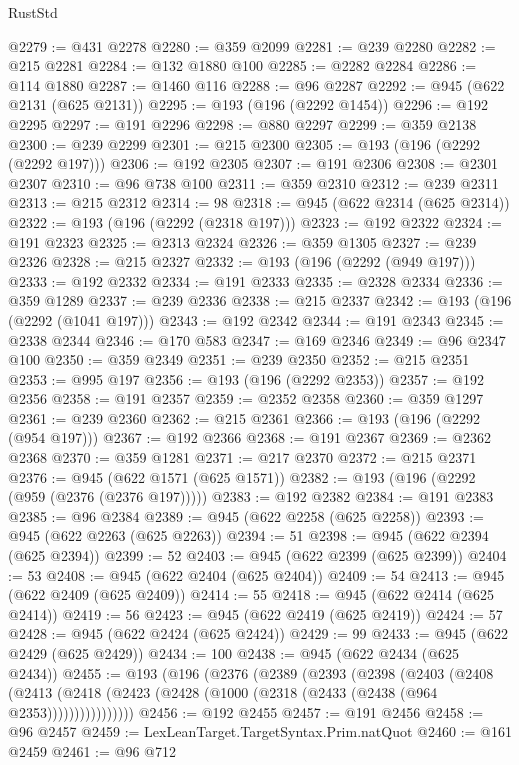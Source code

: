 \begin{lexlean}{RustStd}
\begin{coremodule}
@2279 := @431 @2278
@2280 := @359 @2099
@2281 := @239 @2280
@2282 := @215 @2281
@2284 := @132 @1880 @100
@2285 := @2282 @2284
@2286 := @114 @1880
@2287 := @1460 @116
@2288 := @96 @2287
@2292 := @945 (@622 @2131 (@625 @2131))
@2295 := @193 (@196 (@2292 @1454))
@2296 := @192 @2295
@2297 := @191 @2296
@2298 := @880 @2297
@2299 := @359 @2138
@2300 := @239 @2299
@2301 := @215 @2300
@2305 := @193 (@196 (@2292 (@2292 @197)))
@2306 := @192 @2305
@2307 := @191 @2306
@2308 := @2301 @2307
@2310 := @96 @738 @100
@2311 := @359 @2310
@2312 := @239 @2311
@2313 := @215 @2312
@2314 := 98
@2318 := @945 (@622 @2314 (@625 @2314))
@2322 := @193 (@196 (@2292 (@2318 @197)))
@2323 := @192 @2322
@2324 := @191 @2323
@2325 := @2313 @2324
@2326 := @359 @1305
@2327 := @239 @2326
@2328 := @215 @2327
@2332 := @193 (@196 (@2292 (@949 @197)))
@2333 := @192 @2332
@2334 := @191 @2333
@2335 := @2328 @2334
@2336 := @359 @1289
@2337 := @239 @2336
@2338 := @215 @2337
@2342 := @193 (@196 (@2292 (@1041 @197)))
@2343 := @192 @2342
@2344 := @191 @2343
@2345 := @2338 @2344
@2346 := @170 @583
@2347 := @169 @2346
@2349 := @96 @2347 @100
@2350 := @359 @2349
@2351 := @239 @2350
@2352 := @215 @2351
@2353 := @995 @197
@2356 := @193 (@196 (@2292 @2353))
@2357 := @192 @2356
@2358 := @191 @2357
@2359 := @2352 @2358
@2360 := @359 @1297
@2361 := @239 @2360
@2362 := @215 @2361
@2366 := @193 (@196 (@2292 (@954 @197)))
@2367 := @192 @2366
@2368 := @191 @2367
@2369 := @2362 @2368
@2370 := @359 @1281
@2371 := @217 @2370
@2372 := @215 @2371
@2376 := @945 (@622 @1571 (@625 @1571))
@2382 := @193 (@196 (@2292 (@959 (@2376 (@2376 @197)))))
@2383 := @192 @2382
@2384 := @191 @2383
@2385 := @96 @2384
@2389 := @945 (@622 @2258 (@625 @2258))
@2393 := @945 (@622 @2263 (@625 @2263))
@2394 := 51
@2398 := @945 (@622 @2394 (@625 @2394))
@2399 := 52
@2403 := @945 (@622 @2399 (@625 @2399))
@2404 := 53
@2408 := @945 (@622 @2404 (@625 @2404))
@2409 := 54
@2413 := @945 (@622 @2409 (@625 @2409))
@2414 := 55
@2418 := @945 (@622 @2414 (@625 @2414))
@2419 := 56
@2423 := @945 (@622 @2419 (@625 @2419))
@2424 := 57
@2428 := @945 (@622 @2424 (@625 @2424))
@2429 := 99
@2433 := @945 (@622 @2429 (@625 @2429))
@2434 := 100
@2438 := @945 (@622 @2434 (@625 @2434))
@2455 := @193
    (@196
      (@2376
        (@2389
          (@2393
            (@2398
              (@2403
                (@2408
                  (@2413
                    (@2418 (@2423 (@2428 (@1000 (@2318 (@2433 (@2438 (@964 @2353))))))))))))))))
@2456 := @192 @2455
@2457 := @191 @2456
@2458 := @96 @2457
@2459 := LexLeanTarget.TargetSyntax.Prim.natQuot
@2460 := @161 @2459
@2461 := @96 @712

\end{coremodule}
\end{lexlean}
